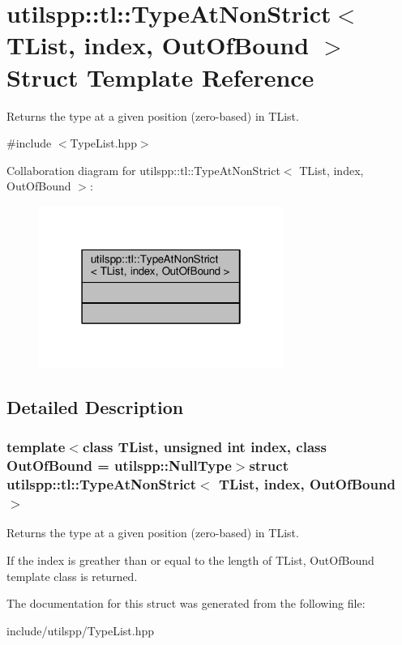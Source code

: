 \hypertarget{structutilspp_1_1tl_1_1TypeAtNonStrict}{\section{utilspp\-:\-:tl\-:\-:Type\-At\-Non\-Strict$<$ T\-List, index, Out\-Of\-Bound $>$ Struct Template Reference}
\label{structutilspp_1_1tl_1_1TypeAtNonStrict}
}


Returns the type at a given position (zero-\/based) in T\-List.  




{\ttfamily \#include $<$Type\-List.\-hpp$>$}



Collaboration diagram for utilspp\-:\-:tl\-:\-:Type\-At\-Non\-Strict$<$ T\-List, index, Out\-Of\-Bound $>$\-:
\nopagebreak
\begin{figure}[H]
\begin{center}
\leavevmode
\includegraphics[width=226pt]{structutilspp_1_1tl_1_1TypeAtNonStrict__coll__graph}
\end{center}
\end{figure}


\subsection{Detailed Description}
\subsubsection*{template$<$class T\-List, unsigned int index, class Out\-Of\-Bound = utilspp\-::\-Null\-Type$>$struct utilspp\-::tl\-::\-Type\-At\-Non\-Strict$<$ T\-List, index, Out\-Of\-Bound $>$}

Returns the type at a given position (zero-\/based) in T\-List. 

If the index is greather than or equal to the length of T\-List, Out\-Of\-Bound template class is returned. 

The documentation for this struct was generated from the following file\-:\begin{DoxyCompactItemize}
\item 
include/utilspp/Type\-List.\-hpp\end{DoxyCompactItemize}

